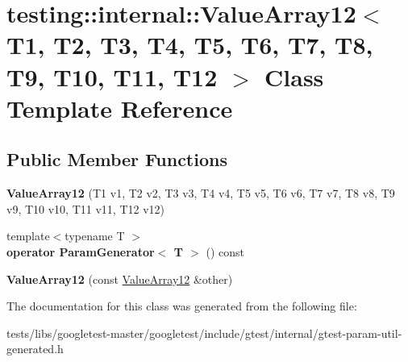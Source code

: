 \hypertarget{classtesting_1_1internal_1_1ValueArray12}{}\section{testing\+:\+:internal\+:\+:Value\+Array12$<$ T1, T2, T3, T4, T5, T6, T7, T8, T9, T10, T11, T12 $>$ Class Template Reference}
\label{classtesting_1_1internal_1_1ValueArray12}
\subsection*{Public Member Functions}
\begin{DoxyCompactItemize}
\item 
\mbox{\label{classtesting_1_1internal_1_1ValueArray12_aaebe12df41b8122fd03f5d6aa1c820a7}} 
{\bfseries Value\+Array12} (T1 v1, T2 v2, T3 v3, T4 v4, T5 v5, T6 v6, T7 v7, T8 v8, T9 v9, T10 v10, T11 v11, T12 v12)
\item 
\mbox{\label{classtesting_1_1internal_1_1ValueArray12_acc840a1c32a10ce160731d66c8105e0b}} 
{\footnotesize template$<$typename T $>$ }\\{\bfseries operator Param\+Generator$<$ T $>$} () const
\item 
\mbox{\label{classtesting_1_1internal_1_1ValueArray12_a901c95791c3b16ca51fcd7fc1323fef2}} 
{\bfseries Value\+Array12} (const \hyperlink{classtesting_1_1internal_1_1ValueArray12}{Value\+Array12} \&other)
\end{DoxyCompactItemize}


The documentation for this class was generated from the following file\+:\begin{DoxyCompactItemize}
\item 
tests/libs/googletest-\/master/googletest/include/gtest/internal/gtest-\/param-\/util-\/generated.\+h\end{DoxyCompactItemize}
